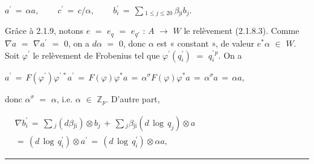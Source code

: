 \documentclass[9pt]{article}
\newcommand{\CanonText}[1]{\par{\fontsize{8.0}{9.35}\selectfont\RaggedRight #1\par}\vspace{2.2pt}}
\newcommand{\CanonDisplay}[1]{\par\vspace{1.2pt}\begin{center}{\fontsize{7.2}{8.4}\selectfont\(\displaystyle #1\)}\end{center}\vspace{1.2pt}}
\newenvironment{CanonMathBlock}{\par\vspace{1.2pt}\begin{center}\fontsize{6.8}{8.0}\selectfont\(\displaystyle}{\)\end{center}\vspace{1.2pt}}
\begin{document}
\begin{minipage}[t][\dimexpr\textheight-5pt\relax][t]{\textwidth}
\CanonDisplay{a^{\prime}\,=\,\alpha{}a,\qquad\,c^{\prime}\,=\,c/\alpha{},\qquad\,b^{\prime}_{i}\,=\,\sum{}_{1\leq{}j\leq{}20}\,\beta{}_{\mathrm{ji}}b_{j}.}
\CanonText{Grâce à 2.1.9, notons \(e\) \(=\) \(e_{q}\) \(=\) \(e_{q'}\) : \(A\) \(\to{}\) \(W\) le relèvement (2.1.8.3). Comme \(\nabla{}a\) \(=\) \(\nabla{}a^{\prime}\) \(=\) 0, on a \(d\alpha{}\) \(=\) 0, donc \(\alpha{}\) est « constant », de valeur \(e^{*}\alpha{}\) \(\in{}\) \(W\). Soit \(\varphi{}^{\prime}\) le relèvement de Frobenius tel que \(\varphi{}^{\prime}(q^{\prime}_{i})\) \(=\) \(q_{i}^{\prime\,p}\). On a}
\CanonDisplay{a^{\prime}\,=\,F(\varphi{}^{\prime})\varphi{}^{\prime\,*}a^{\prime}\,=\,F(\varphi{})\varphi{}^{*}a\,=\,\alpha{}^\sigma{}F(\varphi{})\varphi{}^{*}a\,=\,\alpha{}^\sigma{}a\,=\,\alpha{}a,}
\CanonText{donc \(\alpha{}^\sigma{}\) \(=\) \(\alpha{}\), i.e. \(\alpha{}\) \(\in{}\) \(\mathbb{Z}_{p}\). D'autre part,}
\begin{CanonMathBlock}
\begin{aligned}
& \nabla{}b^{\prime}_{i}\,=\,\sum{}_{j}(d\beta{}_{\mathrm{ji}})\otimes{}b_{j}\,+\,\sum{}_{j}\beta{}_{\mathrm{ji}}(d\,\operatorname{log}\,q_{j})\otimes{}a\\
& =\,(d\,\operatorname{log}\,q^{\prime}_{i})\otimes{}a^{\prime}\,=\,(d\,\operatorname{log}\,q^{\prime}_{i})\otimes{}\alpha{}a,
\end{aligned}
\end{CanonMathBlock}
\vfill
{\color{Accent}\hrule height 0.35pt}\vspace{3pt}
\end{minipage}
\newpage
\end{document}
